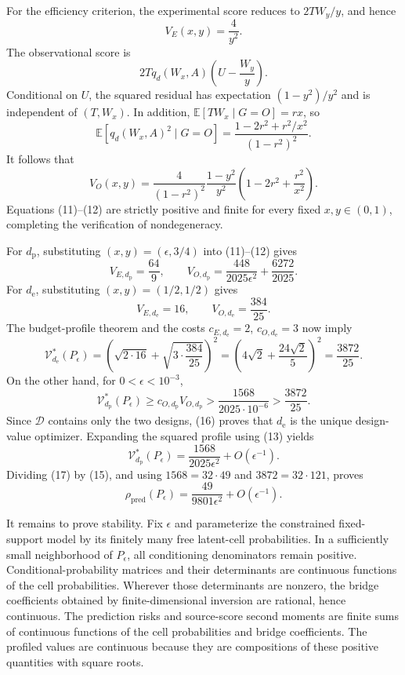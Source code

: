 For the efficiency criterion, the experimental score reduces to \(2TW_y/y\), and hence
\[
 V_E(x,y)=\frac4{y^2}. \tag{11}
\]
The observational score is
\[
 2Tq_d(W_x,A)\left(U-\frac{W_y}{y}\right).
\]
Conditional on \(U\), the squared residual has expectation \((1-y^2)/y^2\) and is independent of \((T,W_x)\).  In addition, \(\mathbb E[TW_x\mid G=O]=rx\), so
\[
 \mathbb E[q_d(W_x,A)^2\mid G=O]
 =\frac{1-2r^2+r^2/x^2}{(1-r^2)^2}.
\]
It follows that
\[
 V_O(x,y)=
 \frac4{(1-r^2)^2}\frac{1-y^2}{y^2}
 \left(1-2r^2+\frac{r^2}{x^2}\right). \tag{12}
\]
Equations (11)--(12) are strictly positive and finite for every fixed \(x,y\in(0,1)\), completing the verification of nondegeneracy.

For \(d_{\mathrm p}\), substituting \((x,y)=(\epsilon,3/4)\) into (11)--(12) gives
\[
 V_{E,d_{\mathrm p}}=\frac{64}{9},
 \qquad
 V_{O,d_{\mathrm p}}
 =\frac{448}{2025\epsilon^2}+\frac{6272}{2025}. \tag{13}
\]
For \(d_{\mathrm e}\), substituting \((x,y)=(1/2,1/2)\) gives
\[
 V_{E,d_{\mathrm e}}=16,
 \qquad
 V_{O,d_{\mathrm e}}=\frac{384}{25}. \tag{14}
\]
The budget-profile theorem and the costs \(c_{E,d_{\mathrm e}}=2\), \(c_{O,d_{\mathrm e}}=3\) now imply
\[
 \mathcal V_{d_{\mathrm e}}^*(P_\epsilon)
 =\left(\sqrt{2\cdot16}+\sqrt{3\cdot\frac{384}{25}}\right)^2
 =\left(4\sqrt2+\frac{24\sqrt2}{5}\right)^2
 =\frac{3872}{25}. \tag{15}
\]
On the other hand, for \(0<\epsilon<10^{-3}\),
\[
 \mathcal V_{d_{\mathrm p}}^*(P_\epsilon)
 \ge c_{O,d_{\mathrm p}}V_{O,d_{\mathrm p}}
 >\frac{1568}{2025\cdot10^{-6}}
 >\frac{3872}{25}. \tag{16}
\]
Since \(\mathcal D\) contains only the two designs, (16) proves that \(d_{\mathrm e}\) is the unique design-value optimizer.  Expanding the squared profile using (13) yields
\[
 \mathcal V_{d_{\mathrm p}}^*(P_\epsilon)
 =\frac{1568}{2025\epsilon^2}+O(\epsilon^{-1}). \tag{17}
\]
Dividing (17) by (15), and using \(1568=32\cdot49\) and \(3872=32\cdot121\), proves
\[
 \rho_{\mathrm{pred}}(P_\epsilon)
 =\frac{49}{9801\epsilon^2}+O(\epsilon^{-1}). \tag{18}
\]

It remains to prove stability.  Fix \(\epsilon\) and parameterize the constrained fixed-support model by its finitely many free latent-cell probabilities.  In a sufficiently small neighborhood of \(P_\epsilon\), all conditioning denominators remain positive.  Conditional-probability matrices and their determinants are continuous functions of the cell probabilities.  Wherever those determinants are nonzero, the bridge coefficients obtained by finite-dimensional inversion are rational, hence continuous.  The prediction risks and source-score second moments are finite sums of continuous functions of the cell probabilities and bridge coefficients.  The profiled values are continuous because they are compositions of these positive quantities with square roots.

